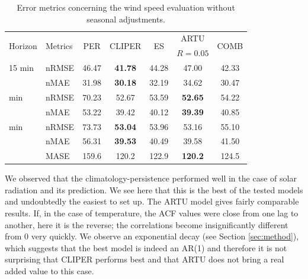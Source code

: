 \begin{table}[tb]
\centering
    \begin{tabular}{@{}llccccc@{}}
        \toprule
        \multirow{2}{*}{Horizon} & \multirow{2}{*}{Metrics} & \multirow{2}{*}{PER} & \multirow{2}{*}{CLIPER} & \multirow{2}{*}{ES} &      ARTU      & \multirow{2}{*}{COMB} \\
                                 &                          &                       &                           &                     &   $R=0.05$   &                       \\ \midrule
        15 min                   & nRMSE                    &         46.47         &      \textbf{41.78}       &        44.28        &     47.00      &         42.33         \\ 
                                 & nMAE                     &         31.98         &      \textbf{30.18}       &        32.19        &     34.62      &         30.47         \\ \addlinespace
        75 min                   & nRMSE                    &         70.23         &           52.67           &        53.59        & \textbf{52.65} &         54.22         \\ 
                                 & nMAE                     &         53.22         &           39.42           &        40.12        & \textbf{39.39} &         40.85         \\ \addlinespace
        150 min                  & nRMSE                    &         73.73         &      \textbf{53.04}       &        53.96        &     53.16      &         55.10         \\ 
                                 & nMAE                     &         56.31         &      \textbf{39.53}       &        40.49        &     39.58      &         41.50         \\ \addlinespace
                                 & MASE                     &         159.6         &           120.2           &        122.9        & \textbf{120.2} &         124.5         \\ \bottomrule
    \end{tabular}
\caption{Error metrics concerning the wind speed evaluation without seasonal adjustments.}
\label{tab:6}
\end{table}

We observed that the climatology-persistence performed well in the case of solar radiation and its prediction. We see here that this is the best of the tested models and undoubtedly the easiest to set up. The ARTU model gives fairly comparable results. If, in the case of temperature, the ACF values were close from one lag to another, here it is the reverse; the correlations become insignificantly different from 0 very quickly. We observe an exponential decay (see Section \ref{sec:method}), which suggests that the best model is indeed an AR(1) and therefore it is not surprising that CLIPER performs best and that ARTU does not bring a real added value to this case.  

